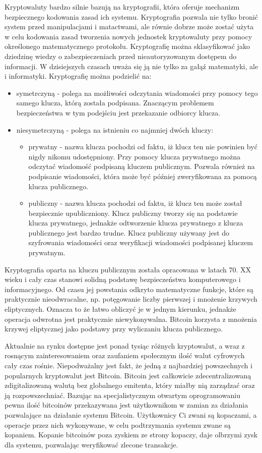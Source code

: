 \documentclass[printmode,oneside]{mgr}
\begin{document}
\indent Kryptowaluty bardzo silnie bazują na kryptografii, która oferuje mechanizm bezpiecznego kodowania zasad ich systemu. Kryptografia pozwala nie tylko bronić system przed manipulacjami i matactwami, ale równie dobrze może zostać użyta w celu kodowania zasad tworzenia nowych jednostek kryptowaluty przy pomocy określonego matematycznego protokołu. Kryptografię można sklasyfikować jako dziedzinę wiedzy o zabezpieczeniach przed nieautoryzowanym dostępem do informacji. W dzisiejszych czasach uważa się ją nie tylko za gałąź matematyki, ale i informatyki. Kryptografię można podzielić na:
\begin{itemize}
\item symetrczyną - polega na możliwości odczytania wiadomości przy pomocy tego samego klucza, którą została podpisana. Znaczącym problemem bezpieczeństwa w tym podejściu jest przekazanie odbiorcy klucza. 
\item niesymetrczyną - polega na istnieniu co najmniej dwóch kluczy:
\begin{itemize}
\item prywatny - nazwa klucza pochodzi od faktu, iż klucz ten nie powinien być nigdy nikomu udostępniony. Przy pomocy klucza prywatnego można odczytać wiadomość podpisaną kluczem publicznym. Pozwala również na podpisanie wiadomości, która może być później zweryfikowana za pomocą klucza publicznego.
\item publiczny - nazwa klucza pochodzi od faktu, iż klucz ten może został bezpiecznie upubliczniony. Klucz publiczny tworzy się na podstawie klucza prywatnego, jednakże odtworzenie klucza prywatnego z klucza publicznego jest bardzo trudne. Klucz publiczny używany jest do szyfrowania wiadomości oraz weryfikacji wiadomości podpisanej kluczem prywatnym.
\end{itemize}
\end{itemize} 
Kryptografia oparta na kluczu publicznym została opracowana w latach 70. XX wieku i cały czas stanowi solidną podstawę bezpieczeństwa komputerowego i informacyjnego. Od czasu jej powstania odkryto matematyczne funkcje, które są praktycznie nieodwracalne, np. potęgowanie liczby pierwszej i mnożenie krzywych eliptycznych. Oznacza to że łatwo obliczyć je w jednym kierunku, jednakże operacja odwrotna jest praktycznie niewykonywalna. Bitcoin korzysta z mnożenia krzywej eliptycznej jako podstawy przy wyliczaniu klucza publicznego. 

\indent Aktualnie na rynku dostępne jest ponad tysiąc różnych kryptowalut, a wraz z rosnącym zainteresowaniem oraz zaufaniem społecznym ilość walut cyfrowych cały czas rośnie. Niepodważalny jest fakt, że jedną z najbardziej powszechnych i popularnych kryptowalut jest Bitcoin. Bitcoin jest całkowicie zdecentralizowaną zdigitalizowaną walutą bez globalnego emitenta, który miałby nią zarządzać oraz ją rozpowszechniać. Bazując na specjalistycznym otwartym oprogramowaniu pewna ilość bitcoinów przekazywana jest użytkownikom w zamian za działania pozwalające na działanie systemu Bitcoin. Użytkownicy Ci zwani są kopaczami, a operacje przez nich wykonywane, w celu podtrzymania systemu zwane są kopaniem. Kopanie bitcoinów poza zyskiem ze strony kopaczy, daje olbrzymi zysk dla systemu, pozwalając weryfikować zlecone transakcje.
\end{document}
